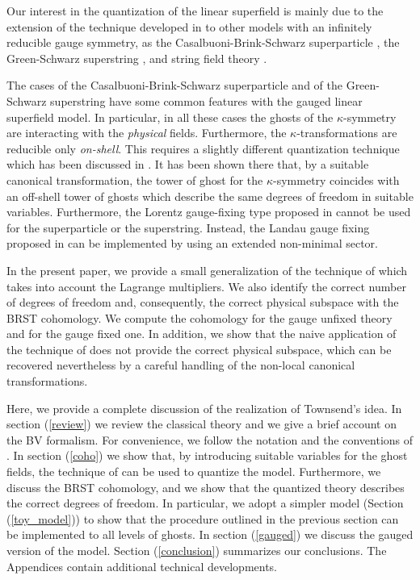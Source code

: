 \documentclass[a4paper,12pt]{article}
\begin{document}
Our interest in the quantization of the linear superfield is mainly
due to the extension of the technique developed in \cite{GPZ,PZ} 
to other models with an infinitely reducible gauge symmetry, as 
the Casalbuoni-Brink-Schwarz superparticle
\cite{Brink-Schwarz,Siegel:1983hh,Lindstrom_BS,GH_BS,superparticle},
the Green-Schwarz superstring
\cite{green3,hiddengh,GSST,bergshoeff,GH,Lindstrom}, and string
field theory \cite{SFT}. 

The cases of the Casalbuoni-Brink-Schwarz superparticle and of the
Green-Schwarz superstring have some common features with the gauged
linear superfield model. In particular, in all these cases the ghosts
of the $\kappa$-symmetry \cite{Siegel:1983hh} are interacting with the
{\it physical} fields.  Furthermore, the $\kappa$-transformations are
reducible only {\it on-shell}.  This requires a slightly different
quantization technique which has been discussed in \cite{porr_2}. It
has been shown there that, by a suitable canonical transformation, the
tower of ghost for the $\kappa$-symmetry coincides with an off-shell
tower of ghosts which describe the same degrees of freedom in suitable
variables.  Furthermore, the Lorentz gauge-fixing type proposed in
\cite{GPZ,PZ} cannot be used for the superparticle or the superstring.
Instead, the Landau gauge fixing proposed in \cite{Lindstrom_BS} can
be implemented by using an extended non-minimal sector.

In the present paper, we provide a small generalization of the
technique of \cite{GPZ} which takes into account the Lagrange
multipliers. We also identify the correct number of degrees of freedom
and, consequently, the correct physical subspace with the BRST
cohomology. We
compute the cohomology for the gauge unfixed theory and for the gauge
fixed one. In addition, we show that the naive application of the
technique of \cite{GPZ} does not provide the correct physical
subspace, which can be recovered nevertheless by a careful handling of
the non-local canonical transformations.

Here, we provide a complete discussion of the realization of
Townsend's idea.  In section (\ref{review}) we review the classical
theory and we give a brief account on the BV formalism. For
convenience, we follow the notation and the conventions of \cite{GPZ}.
In section (\ref{coho}) we show that, by introducing suitable
variables for the ghost fields, the technique of \cite{GPZ} can be
used to quantize the model. Furthermore, we discuss the BRST cohomology, 
and we show that the quantized
theory describes the correct degrees of freedom. In particular, we
adopt a simpler model (Section (\ref{toy_model})) to show that the
procedure outlined in the previous section can be implemented to all
levels of ghosts. In section (\ref{gauged}) we discuss the gauged
version of the model. Section (\ref{conclusion}) summarizes our
conclusions. The Appendices contain additional technical developments.
\end{document}
